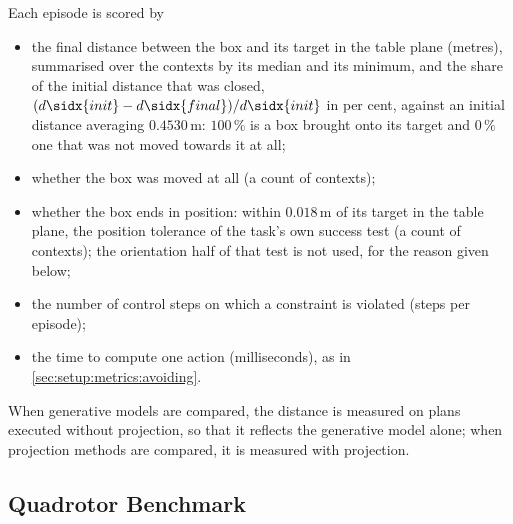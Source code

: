 Each episode is scored by
\begin{itemize}
  \item the final distance between the box and its target in the table plane (metres), summarised over the
    contexts by its median and its minimum, and the share of the initial distance that was closed,
    $(d\sidx{init}-d\sidx{final})/d\sidx{init}$ in per cent, against an initial distance averaging
    $0.4530$\,m: $100\,\%$ is a box brought onto its target and $0\,\%$ one that was not moved towards it
    at all;
  \item whether the box was moved at all (a count of contexts);
  \item whether the box ends in position: within $0.018$\,m of its target in the table plane, the position
    tolerance of the task's own success test (a count of contexts); the orientation half of that test is not
    used, for the reason given below;
  \item the number of control steps on which a constraint is violated (steps per episode);
  \item the time to compute one action (milliseconds), as in \autoref{sec:setup:metrics:avoiding}.
\end{itemize}
When generative models are compared, the distance is measured on plans executed without projection, so
that it reflects the generative model alone; when projection methods are compared, it is measured with
projection.

\subsection{Quadrotor Benchmark}\label{sec:setup:metrics:uav}

